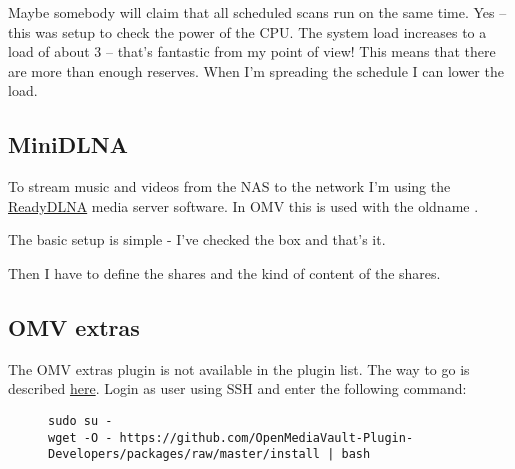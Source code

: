 Maybe somebody will claim that all scheduled scans run on the same time.\linebreak
Yes -- this was setup to check the power of the CPU. The system load increases
to a load of about 3 -- that's fantastic from my point of view! This means that
there are more than enough reserves. When I'm spreading the schedule I can
lower the load.


\subsection{MiniDLNA}

To stream music and videos from the \gls{NAS} to the network I'm using the
\href{https://sourceforge.net/projects/minidlna/}{ReadyDLNA} media server
software. In \gls{OMV} this is used with the oldname .


The basic setup is simple - I've checked the  box and that's
it.


Then I have to define the shares and the kind of content of the shares.


\subsection{\gls{OMV} extras}

The \gls{OMV} extras plugin is not available in the plugin list. The way to go
is described \href{https://forum.openmediavault.org/index.php?thread/39594-omvextras-for-omv6/}{here}.
Login as user  using SSH and enter the following command:

\begin{figure}[H]
    \centering
    \begin{tiny}
        \begin{BVerbatim}
sudo su -
wget -O - https://github.com/OpenMediaVault-Plugin-Developers/packages/raw/master/install | bash
        \end{BVerbatim}
    \end{tiny}
\end{figure}

